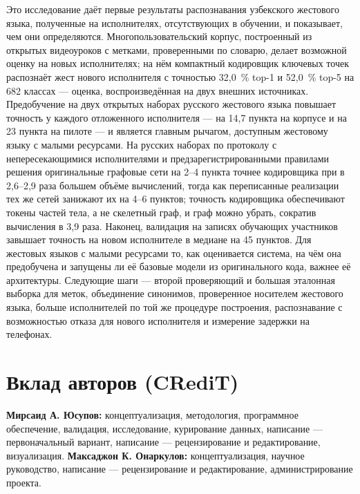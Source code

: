 \documentclass[a4paper,fleqn]{cas-dc}
\begin{document}
Это исследование даёт первые результаты распознавания узбекского жестового языка, полученные на исполнителях, отсутствующих в обучении, и показывает, чем они определяются. Многопользовательский корпус, построенный из открытых видеоуроков с метками, проверенными по словарю, делает возможной оценку на новых исполнителях; на нём компактный кодировщик ключевых точек распознаёт жест нового исполнителя с точностью 32,0~\% top-1 и 52,0~\% top-5 на 682 классах --- оценка, воспроизведённая на двух внешних источниках. Предобучение на двух открытых наборах русского жестового языка повышает точность у каждого отложенного исполнителя --- на 14,7 пункта на корпусе и на 23 пункта на пилоте --- и является главным рычагом, доступным жестовому языку с малыми ресурсами. На русских наборах по протоколу с непересекающимися исполнителями и предзарегистрированными правилами решения оригинальные графовые сети на 2--4 пункта точнее кодировщика при в 2,6--2,9 раза большем объёме вычислений, тогда как переписанные реализации тех же сетей занижают их на 4--6 пунктов; точность кодировщика обеспечивают токены частей тела, а не скелетный граф, и граф можно убрать, сократив вычисления в 3,9 раза. Наконец, валидация на записях обучающих участников завышает точность на новом исполнителе в медиане на 45 пунктов. Для жестовых языков с малыми ресурсами то, как оценивается система, на чём она предобучена и запущены ли её базовые модели из оригинального кода, важнее её архитектуры. Следующие шаги --- второй проверяющий и большая эталонная выборка для меток, объединение синонимов, проверенное носителем жестового языка, больше исполнителей по той же процедуре построения, распознавание с возможностью отказа для нового исполнителя и измерение задержки на телефонах.

\hypertarget{ux432ux43aux43bux430ux434-ux430ux432ux442ux43eux440ux43eux432-credit}{%
\section*{Вклад авторов (CRediT)}\label{ux432ux43aux43bux430ux434-ux430ux432ux442ux43eux440ux43eux432-credit}}

\textbf{Мирсаид А. Юсупов:} концептуализация, методология, программное обеспечение, валидация, исследование, курирование данных, написание --- первоначальный вариант, написание --- рецензирование и редактирование, визуализация. \textbf{Максаджон К. Онаркулов:} концептуализация, научное руководство, написание --- рецензирование и редактирование, администрирование проекта.
\end{document}
